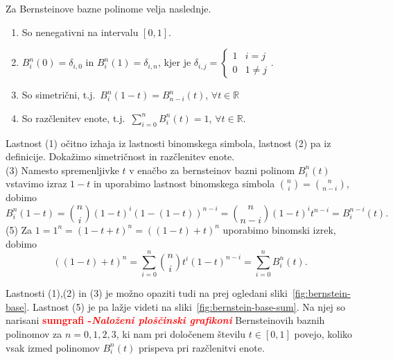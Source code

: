 \documentclass[isrm2, tisk]{fmfdelo}
\newcommand{\R}{\mathbb R}
\newcommand{\bernstein}[2]{\binom{#1}{#2}t^{#2}(1-t)^{#1-#2}}
\newcommand{\mycomment}[1]{\textbf{\textcolor{red}{#1}}}
\begin{document}
    \begin{izrek}
        Za Bernsteinove bazne polinome velja naslednje.
        \label{izrek:bernsteinovi_lastnosti}
        \begin{enumerate}
            \item So nenegativni na intervalu $[0,1]$.\label{izrek:bernsteinovi_lastnosti:pozitivnost}
            \item $B_i^n(0) = \delta_{i,0}$ in $B_i^n(1) = \delta_{i,n}$, kjer je $\delta_{i,j} = \begin{cases}
                                                                                                      1 & i=j \\
                                                                                                      0 & 1\neq j
            \end{cases}.$
            \item So simetrični, t.j.\ $B_i^n(1-t) = B^n_{n-i}(t)$, $\forall t\in\R$ \label{izrek:bernsteinovi_lastnosti:simetrija}
            \item So razčlenitev enote, t.j.\  $\sum_{i=0}^{n}B_{i}^{n}(t) = 1$, $\forall t\in\R$.\label{izrek:bernsteinovi_lastnosti:enota}
        \end{enumerate}
    \end{izrek}
    \begin{dokaz}
        Lastnost (1) očitno izhaja iz lastnosti binomskega simbola, lastnost (2) pa iz definicije.
        Dokažimo simetričnost in razčlenitev enote.\\
        \noindent(3) Namesto spremenljivke $t$ v enačbo za bernsteinov bazni polinom $B_i^n(t)$ vstavimo izraz $1-t$ in uporabimo lastnost binomskega simbola $\binom{n}{i} = \binom{n}{n-i}$, dobimo
        \[B_i^n(1-t) = \binom{n}{i}(1-t)^i(1-(1-t))^{n-i} =  \binom{n}{n-i}(1-t)^it^{n-i} = B^{n-i}_{i}(t).\]
        \noindent(5) Za $1 = 1^n = (1-t+t)^n = ((1-t) + t)^n$ uporabimo binomski izrek, dobimo
        \[\left((1-t) + t\right)^n = \sum_{i=0}^{n}\bernstein{n}{i} = \sum_{i=0}^n B_i^n(t).\]
    \end{dokaz}
    Lastnosti (1),(2) in (3) je možno opaziti tudi na prej ogledani sliki~\ref{fig:bernstein-base}.
    Lastnost (5) je pa lažje videti na sliki~\ref{fig:bernstein-base-sum}.
    Na njej so narisani \mycomment{sumgrafi -\textit{Naloženi ploščinski grafikoni}} Bernsteinovih baznih polinomov za $n=0,1,2,3$, ki nam pri določenem številu $t\in[0,1]$ povejo, koliko vsak izmed polinomov $B_i^n(t)$ prispeva pri razčlenitvi enote.
\end{document}
